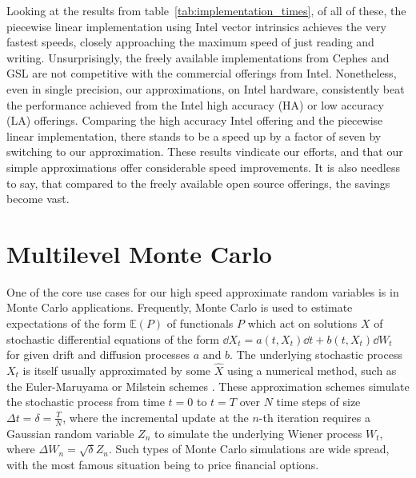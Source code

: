 \documentclass[manuscript,review]{acmart}
\begin{document}
Looking at the results from table~\ref{tab:implementation_times}, of all of these, the piecewise linear implementation using Intel vector intrinsics achieves the very fastest speeds, closely approaching the maximum speed of just reading and writing. Unsurprisingly, the freely available implementations from Cephes and GSL are not competitive with the commercial offerings from Intel. Nonetheless, even in single precision, our approximations, on Intel hardware, consistently beat the performance achieved from the Intel high accuracy (HA) or low accuracy (LA) offerings. Comparing the high accuracy Intel offering and the piecewise linear implementation, there stands to be a speed up by a factor of seven by switching to our approximation. These results vindicate our efforts, and that our simple approximations offer considerable speed improvements. It is also needless to say, that compared to the freely available open source offerings, the savings become vast. 

\section{Multilevel Monte Carlo}
\label{sec:multilevel_monte_carlo}

One of the core use cases for our high speed approximate random variables is in Monte Carlo applications. Frequently, Monte Carlo is used to estimate expectations of the form $ \mathbb{E}(P) $ of functionals $ P $ which act on solutions $ X $ of stochastic differential equations of the form $ \dd{X_t} = a(t, X_t) \dd{t} + b(t, X_t)\dd{W_t} $ for given drift and diffusion processes $ a $ and $ b $. The underlying stochastic process $ X_t $ is itself usually approximated by some $ \widehat{X} $ using a numerical method, such as the Euler-Maruyama or Milstein schemes \citep{asmussen2007stochastic,kloeden1999numerical,lord2014introduction}. These approximation schemes simulate the stochastic process from time $ t = 0 $ to $ t = T $ over $ N $ time steps of size $ \Delta t = \delta = \tfrac{T}{N} $, where the incremental update at the $ n $-th iteration requires a Gaussian random variable $ Z_n $ to simulate the underlying Wiener process $ W_t $, where $ \Delta W_n = \sqrt{\delta}Z_n $. Such types of Monte Carlo simulations are wide spread, with the most famous situation being to price financial options. 
\end{document}
